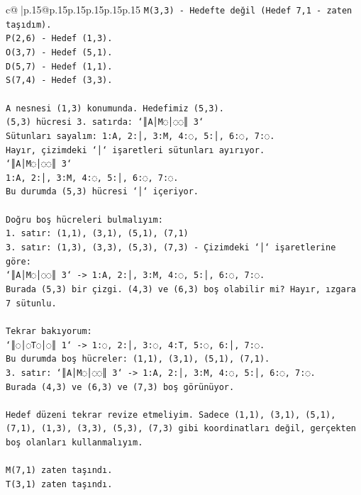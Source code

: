 \documentclass{article}
\begin{document}
{\begin{supertabular}{c@{$\;$}|p{.15\linewidth}@{}p{.15\linewidth}p{.15\linewidth}p{.15\linewidth}p{.15\linewidth}p{.15\linewidth}}
{{{\texttt{M(3,3) {-} Hedefte değil (Hedef 7,1 {-} zaten taşıdım).} \\
\texttt{P(2,6) {-} Hedef (1,3).} \\
\texttt{O(3,7) {-} Hedef (5,1).} \\
\texttt{D(5,7) {-} Hedef (1,1).} \\
\texttt{S(7,4) {-} Hedef (3,3).} \\
\\ 
\texttt{A nesnesi (1,3) konumunda. Hedefimiz (5,3).} \\
\texttt{(5,3) hücresi 3. satırda: `║A│M◌│◌◌║ 3`} \\
\texttt{Sütunları sayalım: 1:A, 2:│, 3:M, 4:◌, 5:│, 6:◌, 7:◌.} \\
\texttt{Hayır, çizimdeki `│` işaretleri sütunları ayırıyor.} \\
\texttt{`║A│M◌│◌◌║ 3`} \\
\texttt{1:A, 2:│, 3:M, 4:◌, 5:│, 6:◌, 7:◌.} \\
\texttt{Bu durumda (5,3) hücresi `│` içeriyor.} \\
\\ 
\texttt{Doğru boş hücreleri bulmalıyım:} \\
\texttt{1. satır: (1,1), (3,1), (5,1), (7,1)} \\
\texttt{3. satır: (1,3), (3,3), (5,3), (7,3) {-} Çizimdeki `│` işaretlerine göre:} \\
\texttt{`║A│M◌│◌◌║ 3` {-}> 1:A, 2:│, 3:M, 4:◌, 5:│, 6:◌, 7:◌.} \\
\texttt{Burada (5,3) bir çizgi. (4,3) ve (6,3) boş olabilir mi? Hayır, ızgara 7 sütunlu.} \\
\\ 
\texttt{Tekrar bakıyorum:} \\
\texttt{`║◌│◌T◌│◌║ 1` {-}> 1:◌, 2:│, 3:◌, 4:T, 5:◌, 6:│, 7:◌.} \\
\texttt{Bu durumda boş hücreler: (1,1), (3,1), (5,1), (7,1).} \\
\texttt{3. satır: `║A│M◌│◌◌║ 3` {-}> 1:A, 2:│, 3:M, 4:◌, 5:│, 6:◌, 7:◌.} \\
\texttt{Burada (4,3) ve (6,3) ve (7,3) boş görünüyor.} \\
\\ 
\texttt{Hedef düzeni tekrar revize etmeliyim. Sadece (1,1), (3,1), (5,1), (7,1), (1,3), (3,3), (5,3), (7,3) gibi koordinatları değil, gerçekten boş olanları kullanmalıyım.} \\
\\ 
\texttt{M(7,1) zaten taşındı.} \\
\texttt{T(3,1) zaten taşındı.} \\
}}}
\end{supertabular}}
\end{document}
